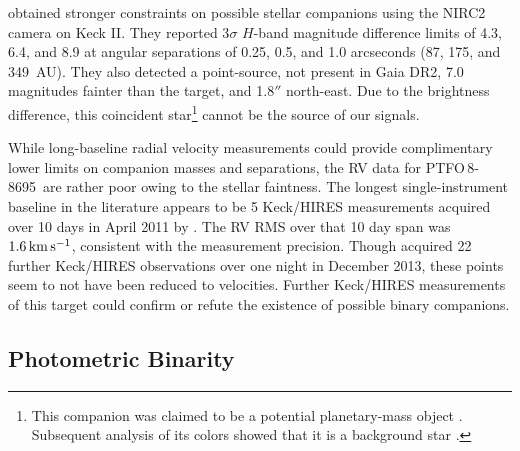 \documentclass[12pt,twocolumn,tighten]{aastex62}
\newcommand{\ptfo}{PTFO$\,$8-8695}
\begin{document}
\citet{van_eyken_ptf_2012} obtained stronger constraints on possible
stellar companions using the NIRC2 camera on Keck II.  They reported
3$\sigma$ $H$-band magnitude difference limits of 4.3, 6.4, and 8.9 at
angular separations of 0.25, 0.5, and 1.0 arcseconds (87, 175, and
349~AU).  They also detected a point-source, not present in Gaia DR2,
7.0 magnitudes fainter than the target, and 1.8$''$ north-east.  Due
to the brightness difference, this coincident star\footnote{This
companion was claimed to be a potential planetary-mass object
\citep{schmidt_direct_2016}. Subsequent analysis of its colors showed
that it is a background star \citep{lee_evidence_2018}.} cannot be the
source of our signals.


While long-baseline radial velocity measurements could provide
complimentary lower limits on companion masses and separations, the RV
data for \ptfo\ are rather poor owing to the stellar faintness.  The
longest single-instrument baseline in the literature appears to be 5
Keck/HIRES measurements acquired over 10 days in April 2011 by
\citet{van_eyken_ptf_2012}.  The RV RMS over that 10 day span was
$1.6\,{\rm km}\,{\rm s}^{-1}$, consistent with the measurement
precision.  Though \citet{yu_tests_2015} acquired 22 further
Keck/HIRES observations over one night in December 2013, these points
seem to not have been reduced to velocities.  Further Keck/HIRES
measurements of this target could confirm or refute the existence of
possible binary companions.



\subsection{Photometric Binarity}
\end{document}
